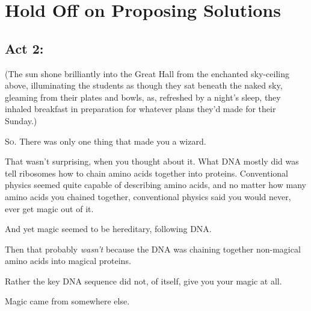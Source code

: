 \chapter{Hold Off on Proposing Solutions}

\section{Act 2:\protect\footnotemark}

(The sun shone brilliantly into the Great Hall from the enchanted sky-ceiling above, illuminating the students as though they sat beneath the naked sky, gleaming from their plates and bowls, as, refreshed by a night’s sleep, they inhaled breakfast in preparation for whatever plans they’d made for their Sunday.)

\lettrine{S}{o.} There was only one thing that made you a wizard.

That wasn’t surprising, when you thought about it. What DNA mostly did was tell ribosomes how to chain amino acids together into proteins. Conventional physics seemed quite capable of describing amino acids, and no matter how many amino acids you chained together, conventional physics said you would never, ever get magic out of it.

And yet magic seemed to be hereditary, following DNA.

Then that probably \emph{wasn’t} because the DNA was chaining together non-magical amino acids into magical proteins.

Rather the key DNA sequence did not, of itself, give you your magic at all.

Magic came from somewhere else.

